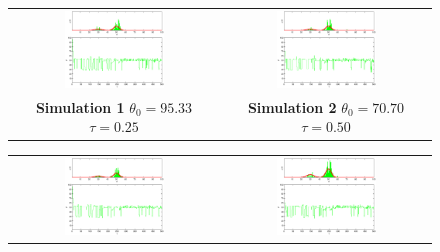 \begin{figure}\label{fig: SimulationMetropolisHasting0}
\begin{tabular}{cc} 
\includegraphics[width=0.5\textwidth]{ImaginiLatex/MetropolisExample1.eps} &
\includegraphics[width=0.5\textwidth]{ImaginiLatex/MetropolisExample2.eps} \\
\textbf{Simulation 1} $\theta_0=   95.33$  $\tau=    0.25$  & \textbf{Simulation 2} $\theta_0=   70.70$  $\tau=    0.50$
\end{tabular}
\begin{tabular}{cc} 
\includegraphics[width=0.5\textwidth]{ImaginiLatex/MetropolisExample3.eps} &
\includegraphics[width=0.5\textwidth]{ImaginiLatex/MetropolisExample4.eps} \\

\end{tabular}
\end{figure}
